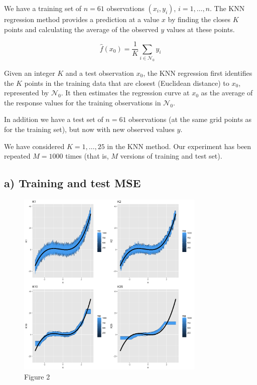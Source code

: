 \documentclass[]{article}
\begin{document}
We have a training set of \(n=61\) observations \((x_i,y_i)\),
\(i=1,\ldots,n\). The KNN regression method provides a prediction at a
value \(x\) by finding the closes \(K\) points and calculating the
average of the observed \(y\) values at these points.

\[\hat{f}(x_0)=\frac{1}{K}\sum_{i\in \mathcal{N}_0} y_i\]

Given an integer \(K\) and a test observation \(x_0\), the KNN
regression first identifies the \(K\) points in the training data that
are closest (Euclidean distance) to \(x_0\), represented by
\(\mathcal{N}_0\). It then estimates the regression curve at \(x_0\) as
the average of the response values for the training observations in
\(\mathcal{N}_0\).

In addition we have a test set of \(n=61\) observations (at the same
grid points as for the training set), but now with new observed values
\(y\).

We have considered \(K=1,\ldots,25\) in the KNN method. Our experiment
has been repeated \(M=1000\) times (that is, \(M\) versions of training
and test set).

\subsection{a) Training and test MSE}\label{a-training-and-test-mse}

\begin{figure}
\centering
\includegraphics[width=0.80000\textwidth]{Prob1f2.png}
\caption{Figure 2}
\end{figure}
\end{document}
